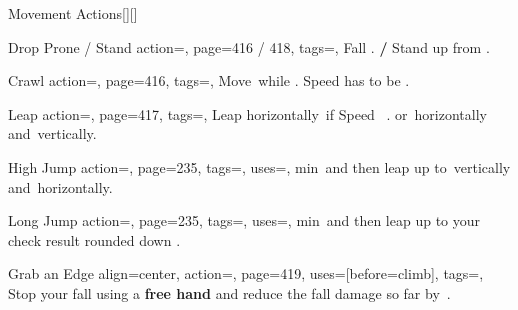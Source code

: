 \begin{PageBackLandscape}
\begin{TablesHalf}{\backTableHeight}
\begin{Table}{Movement Actions}[][]
\begin{entry}{Drop Prone / Stand}{%
                action=,
                page=416 / 418,
                tags=\Move,
            }
                Fall \Prone. \textbf{/} Stand up from \Prone.
            \end{entry}
            \begin{entry}{Crawl}{%
                action=,
                page=416,
                tags=\Move,
            }
                Move \,\Feet while \Prone. Speed has to be .
            \end{entry}
            \breakLine
            \begin{entry}{Leap}{%
                action=,
                page=417,
                tags=\Move,
            }
                Leap horizontally
                \,\Feet if Speed \,\Feet
                .\hfill
                or \,\Feet horizontally and \,\Feet vertically.
            \end{entry}
            \begin{entry}{High Jump}{%
                action=,
                page=235,
                tags=\Move,
                uses={\Athletics[][val=30]},
            }
                 min \,\Feet and then leap up to \,\Feet vertically
                and \,\Feet horizontally.\hfill
            \end{entry}
            \begin{entry}{Long Jump}{%
                action=,
                page=235,
                tags=\Move,
                uses={\Athletics[][val=15]},
            }
                 min \,\Feet and then leap up to your check result rounded down .
                \hfill
                \; 
            \end{entry}
            \begin{entry}{Grab an Edge}{%
                align=center,
                action=,
                page=419,
                uses={[before=climb]},
                tags=\Manipulate,
            }
                Stop your fall using a \textbf{ free hand} and reduce the fall damage so far by 
                \,\Feet.\\\hfill
            \end{entry}

\end{Table}
\end{TablesHalf}
\end{PageBackLandscape}

